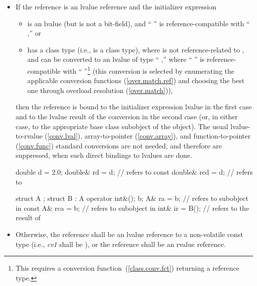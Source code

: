 \begin{itemize}
\item
If the reference is an lvalue reference and the initializer expression

\begin{itemize}
\item
is an lvalue (but is not a
bit-field), and
`` '' is reference-compatible with
`` ,'' or
\item
has a class type (i.e.,
is a class type), where  is not reference-related to , and can be converted
to an lvalue of type `` ,'' where
`` '' is reference-compatible with
`` ''\footnote{This requires a conversion
function~(\ref{class.conv.fct}) returning a reference type.}
(this conversion is selected by enumerating the applicable conversion
functions (\ref{over.match.ref}) and choosing the best one through overload
resolution (\ref{over.match})),
\end{itemize}
then the reference is bound to the initializer expression lvalue in the
first case and to the lvalue result of the conversion
in the second case (or, in either case, to the appropriate base class subobject of the object).
\enternote
The usual lvalue-to-rvalue (\ref{conv.lval}), array-to-pointer
(\ref{conv.array}), and function-to-pointer (\ref{conv.func}) standard
conversions are not needed, and therefore are suppressed, when such
direct bindings to lvalues are done.
\exitnote

\enterexample

\begin{codeblock}
double d = 2.0;
double& rd = d;                 //  refers to 
const double& rcd = d;          //  refers to 

struct A { };
struct B : A { operator int&(); } b;
A& ra = b;                      //  refers to  subobject in 
const A& rca = b;               //  refers to  subobject in 
int& ir = B();                  //  refers to the result of 
\end{codeblock}
\exitexample

\item
Otherwise, the reference shall be an lvalue reference to a non-volatile
const type (i.e.,
\textit{cv1}
shall be
), or the reference shall be an rvalue reference.
\enterexample


\end{itemize}
